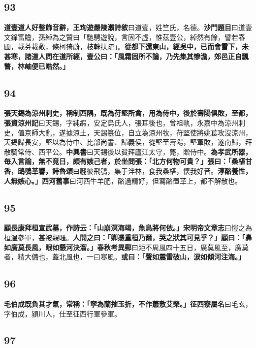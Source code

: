 \subsection*{93}

\textbf{道壹道人好整飾音辭，}{\footnotesize \textbf{王珣遊嚴陵瀨詩敘}曰道壹，姓竺氏，名德。\textbf{沙門題目}曰道壹文鋒富贍，孫綽為之贊曰「馳騁遊說，言固不虛，惟茲壹公，綽然有餘，譬若春圃，載芬載敷，條柯猗蔚，枝榦扶疏」。}\textbf{從都下還東山，經吳中，已而會雪下，未甚寒，諸道人問在道所經，壹公曰：「風霜固所不論，乃先集其慘澹，郊邑正自飄瞥，林岫便已皓然。」}

\subsection*{94}

\textbf{張天錫為涼州刺史，稱制西隅，既為苻堅所禽，用為侍中，後於壽陽俱敗，至都，}{\footnotesize \textbf{張資涼州記}曰天錫，字純嘏，安定烏氏人，張耳後也，曾祖軌，永嘉中為涼州刺史，值京師大亂，遂據涼土，天錫簒位，自立為涼州牧，苻堅使將姚萇攻沒涼州，天錫歸長安，堅以為侍中、比部尚書、歸義侯，從堅至壽陽，堅軍敗，遂南歸，拜散騎常侍、西平公。\textbf{中興書}曰天錫後以貧拜廬江太守，薨，贈侍中。}\textbf{為孝武所器，毎入言論，無不竟日，頗有嫉己者，於坐問張：「北方何物可貴？」張曰：「桑椹甘香，鴟鴞革響，}{\footnotesize \textbf{詩魯頌}曰翩彼飛鴞，集于泮林，食我桑椹，懷我好音。}\textbf{淳酪養性，人無嫉心。」}{\footnotesize \textbf{西河舊事}曰河西牛羊肥，酪過精好，但寫酪置革上，都不解散也。}

\subsection*{95}

\textbf{顧長康拜桓宣武墓，作詩云：「山崩溟海竭，魚鳥將何依。」}{\footnotesize \textbf{宋明帝文章志}曰愷之為桓溫參軍，甚被親暱。}\textbf{人問之曰：「卿憑重桓乃爾，哭之狀其可見乎？」顧曰：「鼻如廣莫長風，眼如懸河決溜。」}{\footnotesize \textbf{春秋考異郵}曰距不周風四十五日，廣莫風至，廣莫者，精大備也，蓋北風也，一曰寒風。}\textbf{或曰：「聲如震雷破山，涙如傾河注海。」}

\subsection*{96}

\textbf{毛伯成既負其才氣，常稱：「寧為蘭摧玉折，不作蕭敷艾榮。」}{\footnotesize \textbf{征西寮屬名}曰毛玄，字伯成，潁川人，仕至征西行軍參軍。}

\subsection*{97}

